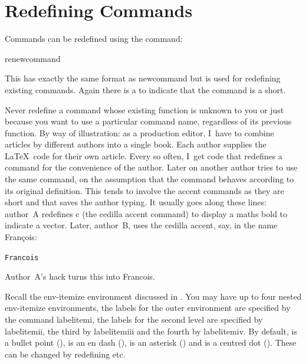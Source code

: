 
\section{Redefining Commands}
\label{sec:renewcom}

Commands can be redefined using the command:
\begin{definition}
\gls{renewcommand}
\end{definition}\reportpagebreak\noindent
This has exactly the same format as \gls{newcommand} but is
used for redefining existing commands.
Again there is a  to indicate that the command
is a \gls{short}.


\warning Never redefine a command whose existing function is unknown
to you or just because you want to use a particular command name,
regardless of its previous function. By way of illustration: as a
production editor, I~have to combine articles by different authors
into a single book. Each author supplies the \LaTeX\ code for their
own article. Every so often, I~get code that redefines a command for
the convenience of the author. Later on another author tries to use
the same command, on the assumption that the command behaves
according to its original definition. This tends to involve the
accent commands as they are short and that saves the author typing.
It usually goes along these lines: author~A redefines \gls{c} (the
cedilla accent command) to display a maths bold
\dq{\boldc} to indicate a
vector. Later, author~B, uses the cedilla accent, say, in the name
Fran\c{c}ois:
\begin{alltt}
Fran\gls{c}ois
\end{alltt}
Author~A's hack turns this into
Fran\boldc cois.


Recall the \gls{env-itemize} environment discussed in
.  You may have up to four nested
\gls{env-itemize} environments, the labels for the outer environment
are specified by the command \gls{labelitemi}, the labels for
the second level are specified by \gls{labelitemii}, the third
by \gls{labelitemiii} and the fourth by \gls{labelitemiv}.
By default,  is a bullet point (),
 is an en dash (), 
 is an
asterisk () and 
 is a centred dot ().  These can be changed by redefining
 etc.

